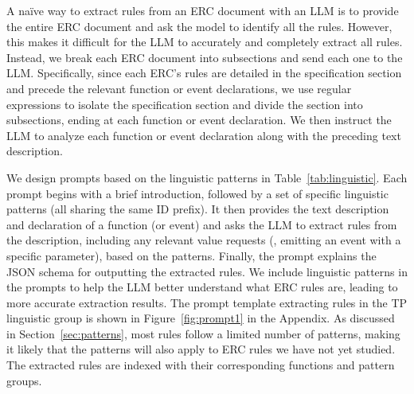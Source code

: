 A naïve way to extract rules from an ERC document 
with an LLM 
is to provide the entire ERC document and ask the model to identify all the rules. 
However, this makes it difficult for the LLM to accurately and completely 
extract all rules. Instead, we break each ERC document into subsections and
send each one to the LLM. 
Specifically, since each ERC’s rules are detailed in the specification section and 
precede the relevant function or event declarations, 
we use regular expressions 
to isolate the specification section and divide the section 
into subsections, ending at each function or event declaration. 
We then instruct the LLM to analyze 
each function or event declaration along 
with the preceding text description.

We design prompts based on the linguistic patterns in Table~\ref{tab:linguistic}. 
Each prompt begins with a brief introduction, followed by a set of specific linguistic patterns (all sharing the same ID prefix). It then provides the text description 
and declaration of a function (or event) and asks the LLM to extract rules 
from the description, including any relevant value requests 
(\eg, emitting an event with a specific parameter), based on the patterns. 
Finally, the prompt explains the JSON schema for outputting the extracted rules.
We include linguistic patterns in the prompts to help the LLM better 
understand what ERC rules are, leading to more accurate extraction results.
%
The prompt template extracting rules in the TP linguistic group is shown in Figure~\ref{fig:prompt1} in the Appendix.
%
As discussed in Section~\ref{sec:patterns}, most rules follow a limited 
number of patterns, making it likely that the patterns will also 
apply to ERC rules we have not yet studied.
%
The extracted rules are indexed with their corresponding 
functions and pattern groups.







